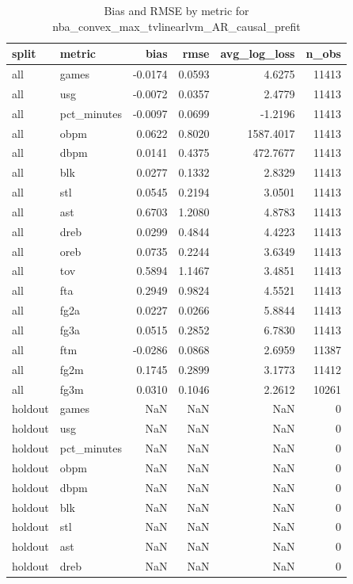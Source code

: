 \begin{table}
\caption{Bias and RMSE by metric for nba_convex_max_tvlinearlvm_AR_causal_prefit}
\label{tab:nba_convex_max_tvlinearlvm_AR_causal_prefit_bias_rmse}
\begin{tabular}{llrrrr}
\toprule
split & metric & bias & rmse & avg\_log\_loss & n\_obs \\
\midrule
all & games & -0.0174 & 0.0593 & 4.6275 & 11413 \\
all & usg & -0.0072 & 0.0357 & 2.4779 & 11413 \\
all & pct\_minutes & -0.0097 & 0.0699 & -1.2196 & 11413 \\
all & obpm & 0.0622 & 0.8020 & 1587.4017 & 11413 \\
all & dbpm & 0.0141 & 0.4375 & 472.7677 & 11413 \\
all & blk & 0.0277 & 0.1332 & 2.8329 & 11413 \\
all & stl & 0.0545 & 0.2194 & 3.0501 & 11413 \\
all & ast & 0.6703 & 1.2080 & 4.8783 & 11413 \\
all & dreb & 0.0299 & 0.4844 & 4.4223 & 11413 \\
all & oreb & 0.0735 & 0.2244 & 3.6349 & 11413 \\
all & tov & 0.5894 & 1.1467 & 3.4851 & 11413 \\
all & fta & 0.2949 & 0.9824 & 4.5521 & 11413 \\
all & fg2a & 0.0227 & 0.0266 & 5.8844 & 11413 \\
all & fg3a & 0.0515 & 0.2852 & 6.7830 & 11413 \\
all & ftm & -0.0286 & 0.0868 & 2.6959 & 11387 \\
all & fg2m & 0.1745 & 0.2899 & 3.1773 & 11412 \\
all & fg3m & 0.0310 & 0.1046 & 2.2612 & 10261 \\
holdout & games & NaN & NaN & NaN & 0 \\
holdout & usg & NaN & NaN & NaN & 0 \\
holdout & pct\_minutes & NaN & NaN & NaN & 0 \\
holdout & obpm & NaN & NaN & NaN & 0 \\
holdout & dbpm & NaN & NaN & NaN & 0 \\
holdout & blk & NaN & NaN & NaN & 0 \\
holdout & stl & NaN & NaN & NaN & 0 \\
holdout & ast & NaN & NaN & NaN & 0 \\
holdout & dreb & NaN & NaN & NaN & 0 \\

\end{tabular}
\end{table}
